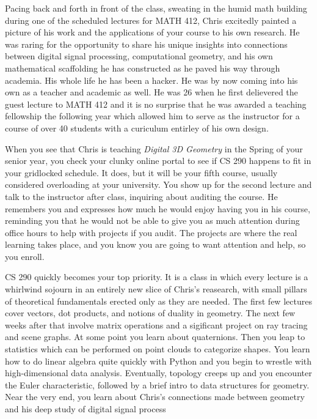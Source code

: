 \documentclass[../main.tex]{subfiles}
\begin{document}
 Pacing back and forth in front of the class, sweating in the humid math building during one of the scheduled lectures for MATH 412, Chris excitedly painted a picture of his work and the applications of your course to his own research. He was raring for the opportunity to share his unique insights into connections between digital signal processing, computational geometry, and his own mathematical scaffolding he has constructed as he paved his way through academia. His whole life he has been a hacker. He was by now coming into his own as a teacher and academic as well. He was 26 when he first delievered the guest lecture to MATH 412 and it is no surprise that he was awarded a teaching fellowship the following year which allowed him to serve as the instructor for a course of over 40 students with a curiculum entirley of his own design.
 
When you see that Chris is teaching \textit{Digital 3D Geometry} in the Spring of your senior year, you check your clunky online portal to see if CS 290 happens to fit in your gridlocked schedule. It does, but it will be your fifth course, usually considered overloading at your university. You show up for the second lecture and talk to the instructor after class, inquiring about auditing the course. He remembers you and expresses how much he would enjoy having you in his course, reminding you that he would not be able to give you as much attention during office hours to help with projects if you audit. The projects are where the real learning takes place, and you know you are going to want attention and help, so you enroll.

CS 290 quickly becomes your top priority. It is a class in which every lecture is a whirlwind sojourn in an entirely new slice of Chris's reasearch, with small pillars of theoretical fundamentals erected only as they are needed. The first few lectures cover vectors, dot products, and notions of duality in geometry. The next few weeks after that involve matrix operations and a sigificant project on ray tracing and scene graphs. At some point you learn about quaternions. Then you leap to statistics which can be performed on point clouds to categorize shapes. You learn how to do linear algebra quite quickly with Python and you begin to wrestle with high-dimensional data analysis. Eventually, topology creeps up and you encounter the Euler characteristic, followed by a brief intro to data structures for geometry. Near the very end, you learn about Chris's connections made between geometry and his deep study of digital signal process
 
\end{document}
